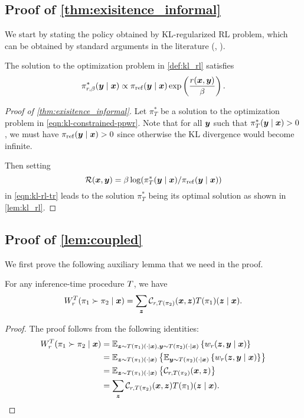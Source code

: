 \subsection{Proof of \cref{thm:exisitence_informal}}
We start by stating the policy obtained by KL-regularized RL problem,  which can be obtained by standard arguments in the literature (\eg, \citep{korbak2022rl, rafailov2024direct, yang2024asymptotics}).

\begin{lemma}\label{lem:kl_rl}
The solution to the optimization problem in  \cref{def:kl_rl} satisfies
\[
    \pi_{r, \beta}^*({\bm{y}} \mid {\bm{x}}) \propto {\pi_{\rm ref}}({\bm{y}} \mid {\bm{x}}) \exp\left(\frac{r({\bm{x}}, {\bm{y}})}{\beta}\right).
\]
\end{lemma}

\begin{proof}[Proof of \cref{thm:exisitence_informal}]
Let $\pi_T^*$ be a solution to the optimization problem in \cref{eqn:kl-constrained-ppwr}. Note that for all ${\bm{y}}$ such that $\pi_T^*({\bm{y}} \mid {\bm{x}}) > 0$, we must have ${\pi_{\rm ref}}({\bm{y}} \mid {\bm{x}}) >0$ since otherwise the KL divergence would become infinite.

Then setting
%
$$\mathcal{R}({\bm{x}}, {\bm{y}})  =  \beta \log(\pi_T^*({\bm{y}} \mid {\bm{x}}) / {\pi_{\rm ref}}({\bm{y}} \mid {\bm{x}}))$$ in \cref{eqn:kl-rl-tr} leads to the solution $\pi_T^*$ being its optimal solution as shown in \cref{lem:kl_rl}.
\end{proof}


\subsection{Proof of \cref{lem:coupled}}
We first prove the following auxiliary lemma that we need in the proof.
\begin{lemma}\label{lem:pp_win_rate_decompose}
For any inference-time procedure $T$, we have
\[
    W^T_r(\pi_1 \succ \pi_2 \mid {\bm{x}}) = \sum_{{\bm{z}}} \mathcal{C}_{r, T(\pi_2)}({\bm{x}}, {\bm{z}}) T(\pi_1)({\bm{z}} \mid{\bm{x}}).
\]
\end{lemma}
\begin{proof}
The proof follows from the following identities:
    \begin{align*}
     W^T_r(\pi_1 \succ \pi_2 \mid {\bm{x}})&  = \mathbb{E}_{{\bm{z}} \sim T(\pi_1)(\cdot \mid {\bm{x}}), {\bm{y}} \sim T(\pi_2)(\cdot \mid {\bm{x}})} \left\{w_r({\bm{z}}, {\bm{y}} \mid {\bm{x}})\right\} \\
     & = \mathbb{E}_{{\bm{z}} \sim T(\pi_1)(\cdot \mid {\bm{x}})} \left\{\mathbb{E}_{{\bm{y}} \sim T(\pi_2)(\cdot \mid {\bm{x}})}\left\{w_r({\bm{z}}, {\bm{y}} \mid {\bm{x}})\right\} \right\} \\
     & =  \mathbb{E}_{{\bm{z}} \sim T(\pi_1)(\cdot \mid {\bm{x}})} \left\{ \mathcal{C}_{r, T(\pi_2)}({\bm{x}}, {\bm{z}}) \right\} \\
     & = \sum_{{\bm{z}}} \mathcal{C}_{r, T(\pi_2)}({\bm{x}}, {\bm{z}}) T(\pi_1)({\bm{z}} \mid{\bm{x}}).
    \end{align*}
\end{proof}

